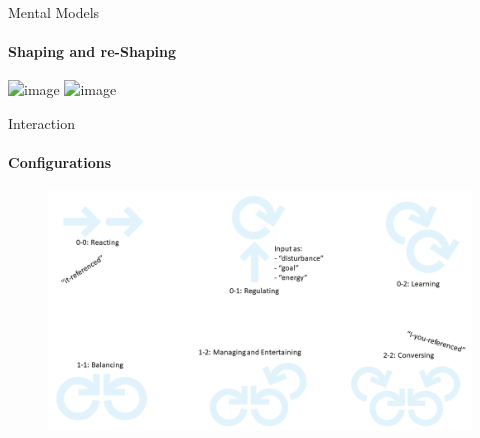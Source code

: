 \documentclass[
	11pt,
	aspectratio=169,
]{beamer}
\begin{document}
    \begin{frame}{Mental Models}
        \framesubtitle{Shaping and re-Shaping}
            \centering\includegraphics<1>[width=0.75\textwidth]{resources/models6.PNG}
            \centering\includegraphics<2>[height=0.77\textheight]{resources/models7.PNG}
    \end{frame}
    \begin{frame}{Interaction}
        \framesubtitle{Configurations \cite{pangaro_web}}
		\begin{figure}
		    \centering
		    \includegraphics[height=0.75\textheight]{resources/interaction.PNG}
		\end{figure}
    \end{frame}
\end{document}
